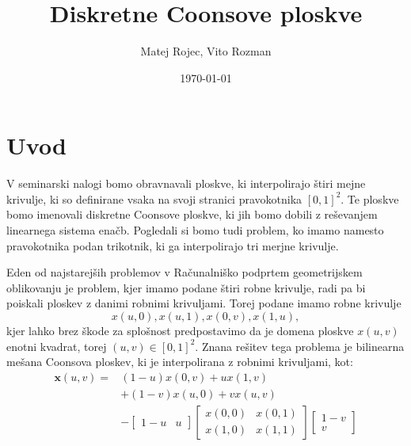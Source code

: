 \documentclass[a4paper,12pt]{article}
\begin{document}
\newcommand{\N}{\mathbb{N}}
\newcommand{\R}{\mathbb{R}}
\newcommand\sbullet[1][.5]{\mathbin{\vcenter{\hbox{\scalebox{#1}{$\bullet$}}}}}
\newtheorem{definicija}{Definicija}[section]
\newtheorem{primer}[definicija]{Primer}
\newtheorem{opomba}[definicija]{Opomba}

\title{Diskretne Coonsove ploskve}
\author{Matej Rojec, Vito Rozman}
\date{\today}

\maketitle


\newpage

\tableofcontents
\listoffigures

\newpage

\section{Uvod}

V seminarski nalogi bomo obravnavali ploskve, ki interpolirajo štiri mejne krivulje,
ki so definirane vsaka na svoji stranici pravokotnika $[0,1]^2$. 
Te ploskve bomo imenovali diskretne Coonsove ploskve, 
ki jih bomo dobili z reševanjem linearnega sistema enačb.
Pogledali si bomo tudi problem, ko imamo namesto pravokotnika podan 
trikotnik, ki ga interpolirajo tri merjne krivulje.


Eden od najstarejših problemov v Računalniško podprtem geometrijskem oblikovanju je problem, 
kjer imamo podane štiri robne krivulje, radi pa bi poiskali ploskev z danimi robnimi krivuljami. 
Torej podane imamo robne krivulje $$x(u,0), x(u,1), x(0,v),  x(1,u),$$ kjer lahko brez škode za 
splošnost predpostavimo da je domena ploskve $x(u,v)$ enotni kvadrat, torej $(u,v) \in [0,1]^2$. 
Znana rešitev tega problema je bilinearna mešana Coonsova ploskev, ki je interpolirana z robnimi 
krivuljami, kot: 
\begin{align*}
   \label{continiusCons}
   \mathbf{x}(u,v) =& (1-u)x(0,v) +ux(1,v)\\
    & + (1-v)x(u,0) +vx(u,v) \\
   & - 
   \begin{bmatrix} 
      1-u & u 
   \end{bmatrix}
   \begin{bmatrix} 
      x(0,0)& x(0,1)\\
      x(1,0)& x(1,1) 
   \end{bmatrix}
   \begin{bmatrix}
      1-v\\
      v
   \end{bmatrix}
\end{align*}
\end{document}
